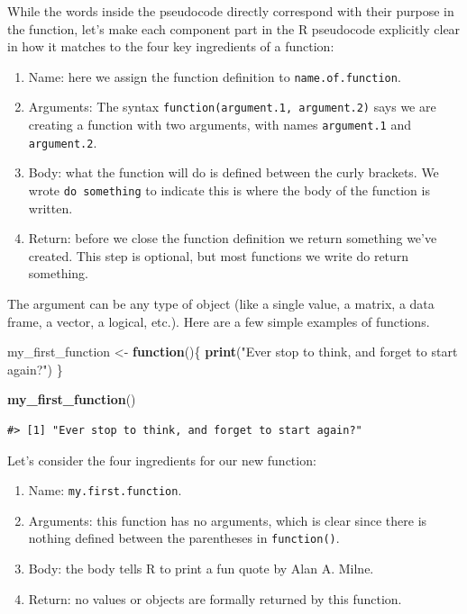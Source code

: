 \documentclass[
  11pt,
]{krantz}
\newenvironment{Shaded}{\begin{snugshade}}{\end{snugshade}}
\newcommand{\ControlFlowTok}[1]{\textcolor[rgb]{0.13,0.29,0.53}{\textbf{#1}}}
\newcommand{\KeywordTok}[1]{\textcolor[rgb]{0.13,0.29,0.53}{\textbf{#1}}}
\newcommand{\NormalTok}[1]{#1}
\newcommand{\StringTok}[1]{\textcolor[rgb]{0.31,0.60,0.02}{#1}}
\providecommand{\tightlist}{%
  \setlength{\itemsep}{0pt}\setlength{\parskip}{0pt}}
\theoremstyle{definition}
\theoremstyle{definition}
\theoremstyle{definition}
\theoremstyle{definition}
\theoremstyle{remark}
\begin{document}
While the words inside the pseudocode directly correspond with their purpose in the function, let's make each component part in the R pseudocode explicitly clear in how it matches to the four key ingredients of a function:

\begin{enumerate}
\def\labelenumi{\arabic{enumi}.}
\tightlist
\item
  Name: here we assign the function definition to \texttt{name.of.function}.
\item
  Arguments: The syntax \texttt{function(argument.1,\ argument.2)} says we are creating a function with two arguments, with names \texttt{argument.1} and \texttt{argument.2}.
\item
  Body: what the function will do is defined between the curly brackets. We wrote \texttt{do\ something} to indicate this is where the body of the function is written.
\item
  Return: before we close the function definition we return something we've created. This step is optional, but most functions we write do return something.
\end{enumerate}

The argument can be any type of object (like a single value, a matrix, a data frame, a vector, a logical, etc.). Here are a few simple examples of functions.

\begin{Shaded}
\begin{Highlighting}[]
\NormalTok{my\_first\_function \textless{}{-}}\StringTok{ }\ControlFlowTok{function}\NormalTok{()\{}
  \KeywordTok{print}\NormalTok{(}\StringTok{"Ever stop to think, and forget to start again?"}\NormalTok{)}
\NormalTok{\}}

\KeywordTok{my\_first\_function}\NormalTok{()}
\end{Highlighting}
\end{Shaded}

\begin{verbatim}
#> [1] "Ever stop to think, and forget to start again?"
\end{verbatim}

Let's consider the four ingredients for our new function:

\begin{enumerate}
\def\labelenumi{\arabic{enumi}.}
\tightlist
\item
  Name: \texttt{my.first.function}.
\item
  Arguments: this function has no arguments, which is clear since there is nothing defined between the parentheses in \texttt{function()}.
\item
  Body: the body tells R to print a fun quote by Alan A. Milne.
\item
  Return: no values or objects are formally returned by this function.
\end{enumerate}
\end{document}
